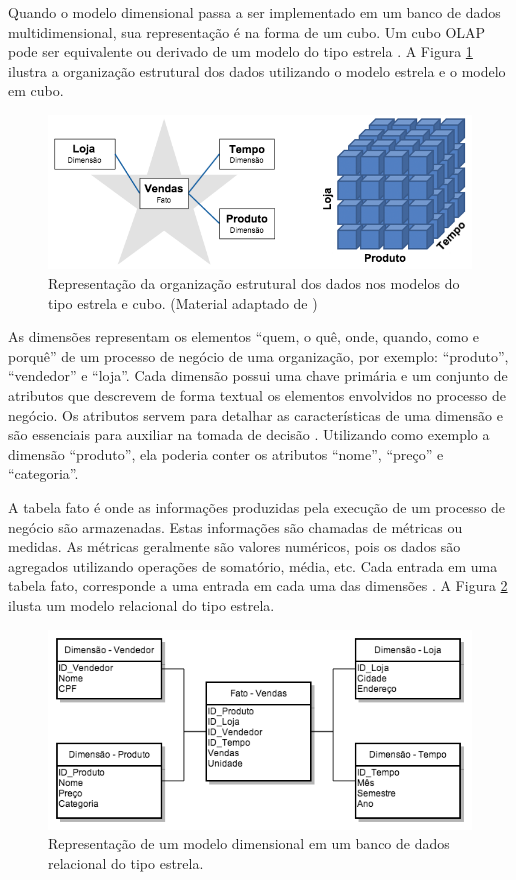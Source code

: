 Quando o modelo dimensional passa a ser implementado em um banco de dados multidimensional, sua representação é na forma de um cubo. Um cubo OLAP pode ser equivalente ou derivado de um modelo do tipo estrela \cite{KIM13}. A Figura \ref{fig:starVSolap} ilustra a organização estrutural dos dados utilizando o modelo estrela e o modelo em cubo.

\begin{figure}[h]
	\center
	\includegraphics[width=14cm]{images/starvsolap.png}
	\caption{Representação da organização estrutural dos dados nos modelos do tipo estrela e cubo. (Material adaptado de \cite{KIM13})}
	\label{fig:starVSolap}
\end{figure}

As dimensões representam os elementos ``quem, o quê, onde, quando, como e porquê'' de um processo de negócio de uma organização, por exemplo: ``produto'', ``vendedor'' e ``loja''. Cada dimensão possui uma chave primária e um conjunto de atributos que descrevem de forma textual os elementos envolvidos no processo de negócio. Os atributos servem para detalhar as características de uma dimensão e são essenciais para auxiliar na tomada de decisão \cite{KIM13}. Utilizando como exemplo a dimensão ``produto'', ela poderia conter os atributos ``nome'', ``preço'' e ``categoria''.

A tabela fato é onde as informações produzidas pela execução de um processo de negócio são armazenadas. Estas informações são chamadas de métricas ou medidas. As métricas geralmente são valores numéricos, pois os dados são agregados utilizando operações de somatório, média, etc. Cada entrada em uma tabela fato, corresponde a uma entrada em cada uma das dimensões \cite{KIM13}. A Figura \ref{fig:exOlap} ilusta um modelo relacional do tipo estrela.

\begin{figure}[h]
	\center
	\includegraphics[width=13cm]{images/ex_olap.png}
	\caption{Representação de um modelo dimensional em um banco de dados relacional do tipo estrela.}
	\label{fig:exOlap}
\end{figure}

